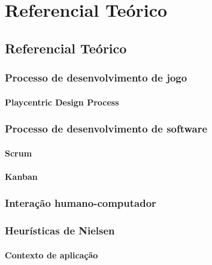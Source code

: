 \part{Referencial Teórico}

\chapter[Referencial Teórico]{Referencial Teórico}



\section{Processo de desenvolvimento de jogo}



\subsection{Playcentric Design Process}



\section{Processo de desenvolvimento de software}



\subsection{Scrum}



\subsection{Kanban}



\section{Interação humano-computador}



\section{Heurísticas de Nielsen}



\subsection{Contexto de aplicação}



